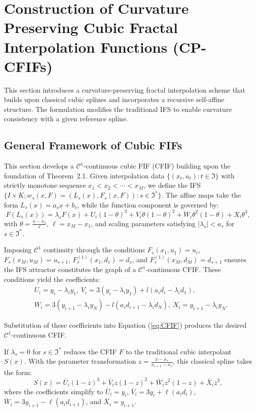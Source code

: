 \documentclass[runningheads]{llncs}
\begin{document}
	\section{Construction of Curvature Preserving Cubic Fractal Interpolation Functions (CP-CFIFs)}\label{sec3}
	This section introduces a curvature-preserving fractal interpolation scheme that builds upon classical cubic splines and incorporates a recursive self-affine structure. The formulation modifies the traditional IFS to enable curvature consistency with a given reference spline.
	
	\subsection{General Framework of Cubic FIFs}
	This section develops a $\mathcal{C}^1$-continuous cubic FIF (CFIF) building upon the foundation of Theorem~2.1. Given interpolation data $\{(x_t, u_t): t \in \Im\}$ with strictly monotone sequence $x_1 < x_2 < \cdots < x_M$, we define the IFS $\{I \times K; w_s(x, F) = (L_s(x), F_s(x, F)) : s \in \Im^*\}$. The affine maps take the form $L_s(x) = a_s x + b_s$, while the function component is governed by:
	\begin{equation}\label{eq:CFIF}
		F(L_s(x)) = \lambda_s F(x) + U_i(1-\theta)^3 + V_i\theta (1-\theta)^2 + W_i\theta^2 (1-\theta) + X_i \theta^3,
	\end{equation}
	with $\theta = \frac{x - x_1}{\ell}$, $\ell = x_M - x_1$, and scaling parameters satisfying $|\lambda_s| < a_s$ for $s \in \Im^*$.
	
	Imposing $\mathcal{C}^1$ continuity through the conditions $F_s(x_1, u_1) = u_i$, $F_s(x_M, u_M) = u_{s+1}$, $F_s^{(1)}(x_1, d_1) = d_s$, and $F_s^{(1)}(x_M, d_M) = d_{s+1}$ ensures the IFS attractor constitutes the graph of a $\mathcal{C}^1$-continuous CFIF. These conditions yield the coefficients:
	\begin{align*}
		& U_i = y_i - \lambda_i y_1,\  V_i = 3(y_i - \lambda_i y_1) + l(a_id_i-\lambda_id_1), \\
		& W_i = 3(y_{i+1} - \lambda_i y_N) - l(a_id_{i+1}-\lambda_id_N), \ X_i = y_{i+1} - \lambda_i y_N.
	\end{align*}
	
	Substitution of these coefficients into Equation (\ref{eq:CFIF}) produces the desired $\mathcal{C}^1$-continuous CFIF.
	
	\begin{remark}
		If $\lambda_s = 0$ for $s \in \Im^*$ reduces the CFIF $F$ to the traditional cubic interpolant $S(x)$. With the parameter transformation $z = \frac{x - x_s}{x_{s+1} - x_s}$, this classical spline takes the form:
		\begin{equation}
			S(x) = \bar{U}_i(1-z)^3 + \bar{V}_i z(1-z)^2 + \bar{W}_iz^2 (1-z) + \bar{X}_iz^3,
		\end{equation}
		where the coefficients simplify to $\bar{U}_i = y_i$, $\bar{V}_i = 3y_i + \ell (a_id_i)$, $\bar{W}_i = 3y_{i+1} - \ell(a_id_{i+1})$, and $\bar{X}_i = y_{i+1}$.
	\end{remark}
	
\end{document}
